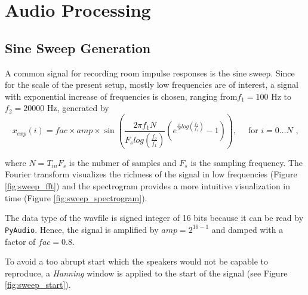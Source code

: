 \newpage
\section{Audio Processing}

\subsection{Sine Sweep Generation}

A common signal for recording room impulse responses is the sine sweep. 
Since for the scale of the present setup, mostly low frequencies are of interest, a signal with exponential increase of frequencies is chosen, ranging from$f_1=100 \text{ Hz}$ to $f_2=20000 \text{ Hz}$, generated by 
\begin{equation}
    x_{exp}(i) = fac \times amp \times \sin(\frac{2 \pi f_1 N}{F_s log(\frac{f_2}{f_1})}  (e^{\frac{i}{N}log(\frac{f_2}{f_1})} - 1)), \quad \text{ for $i = 0 \ldots N$ ,}
    \label{}
\end{equation}

where $N=T_{in} F_s$ is the nubmer of samples and $F_s$ is the sampling frequency. The Fourier transform visualizes the richness of the signal in low frequencies (Figure \ref{fig:sweep_fft}) and the spectrogram provides a more intuitive visualization in time (Figure \ref{fig:sweep_spectrogram}).

The data type of the wavfile is signed integer of 16 bits because it can be read by \texttt{PyAudio}. Hence, the signal is amplified by $amp=2^{16-1}$ and damped with a factor of $fac=0.8$. 

To avoid a too abrupt start which the speakers would not be capable to reproduce, a \textit{Hanning} window is applied to the start of the signal (see Figure \ref{fig:sweep_start}).

